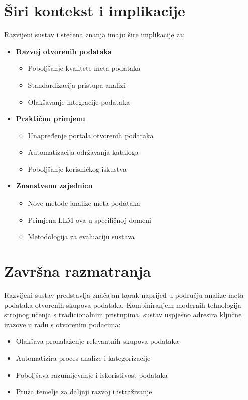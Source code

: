 \section{Širi kontekst i implikacije}
\label{sec:implications}

Razvijeni sustav i stečena znanja imaju šire implikacije za:

\begin{itemize}
    \item \textbf{Razvoj otvorenih podataka}
    \begin{itemize}
        \item Poboljšanje kvalitete meta podataka
        \item Standardizacija pristupa analizi
        \item Olakšavanje integracije podataka
    \end{itemize}
    
    \item \textbf{Praktičnu primjenu}
    \begin{itemize}
        \item Unapređenje portala otvorenih podataka
        \item Automatizacija održavanja kataloga
        \item Poboljšanje korisničkog iskustva
    \end{itemize}
    
    \item \textbf{Znanstvenu zajednicu}
    \begin{itemize}
        \item Nove metode analize meta podataka
        \item Primjena LLM-ova u specifičnoj domeni
        \item Metodologija za evaluaciju sustava
    \end{itemize}
\end{itemize}

\section{Završna razmatranja}
\label{sec:final_thoughts}

Razvijeni sustav predstavlja značajan korak naprijed u području analize meta 
podataka otvorenih skupova podataka. Kombiniranjem modernih tehnologija strojnog 
učenja s tradicionalnim pristupima, sustav uspješno adresira ključne izazove u 
radu s otvorenim podacima:

\begin{itemize}
    \item Olakšava pronalaženje relevantnih skupova podataka
    \item Automatizira proces analize i kategorizacije
    \item Poboljšava razumijevanje i iskoristivost podataka
    \item Pruža temelje za daljnji razvoj i istraživanje
\end{itemize}

